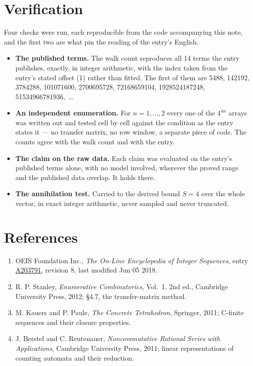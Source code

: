 \documentclass[11pt]{article}
\theoremstyle{definition}
\begin{document}
\section{Verification}

Four checks were run, each reproducible from the code accompanying this note, and the first two are what pin the reading of the entry's English.

\begin{itemize}

\item {\bfseries The published terms.} The walk count reproduces all 14 terms the entry publishes, exactly, in integer arithmetic, with the index taken from the entry's stated offset (1) rather than fitted. The first of them are 5488, 142192, 3784288, 101071600, 2700695728, 72168659104, 1928524187248, 51534966781936,~\dots

\item {\bfseries An independent enumeration.} For $n = 1,\dots,2$ every one of the $4^{4n}$ arrays was written out and tested cell by cell against the condition as the entry states it --- no transfer matrix, no row window, a separate piece of code. The counts agree with the walk count and with the entry.

\item {\bfseries The claim on the raw data.} Each claim was evaluated on the entry's published terms alone, with no model involved, wherever the proved range and the published data overlap. It holds there.

\item {\bfseries The annihilation test.} Carried to the derived bound $S = 4$ over the whole vector, in exact integer arithmetic, never sampled and never truncated.

\end{itemize}

\section{References}

\begin{enumerate}

\item OEIS Foundation Inc., \emph{The On-Line Encyclopedia of Integer Sequences}, entry \href{https://oeis.org/A203791}{A203791}, revision 8, last modified Jun 05 2018.

\item R. P. Stanley, \emph{Enumerative Combinatorics}, Vol.~1, 2nd ed., Cambridge University Press, 2012; \S4.7, the transfer-matrix method.

\item M. Kauers and P. Paule, \emph{The Concrete Tetrahedron}, Springer, 2011; C-finite sequences and their closure properties.

\item J. Berstel and C. Reutenauer, \emph{Noncommutative Rational Series with Applications}, Cambridge University Press, 2011; linear representations of counting automata and their reduction.

\end{enumerate}
\end{document}
